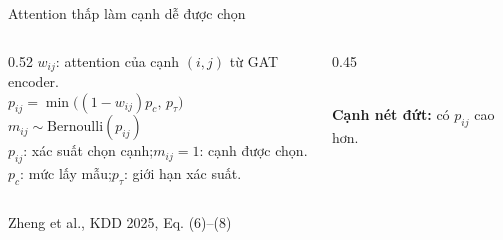     \begin{frame}{Attention thấp làm cạnh dễ được chọn}
      \begin{columns}[T,onlytextwidth]
        \begin{column}{0.52\textwidth}
          \vspace{0.5em}
          $w_{ij}$: attention của cạnh $(i,j)$ từ GAT encoder.\\[1.0em]
          {\Large
          $\displaystyle p_{ij}=
          \min\!\bigl((1-w_{ij})p_c,\,p_\tau\bigr)$
          }\\[0.9em]
          $m_{ij}\sim\mathrm{Bernoulli}(p_{ij})$\\[1.0em]
          \small $p_{ij}$: xác suất chọn cạnh;\quad $m_{ij}=1$: cạnh được chọn.\\[0.35em]
          $p_c$: mức lấy mẫu;\quad $p_\tau$: giới hạn xác suất.\\[0.35em]
        \end{column}
        \begin{column}{0.45\textwidth}
          \centering
          \\[0.7em]
          \small\textcolor{orange!90!black}{\textbf{Cạnh nét đứt:}} có $p_{ij}$ cao hơn.
        \end{column}
      \end{columns}
      \vfill
      \centering
      {\tiny Zheng et al., KDD 2025, Eq. (6)–(8)}
    \end{frame}
    
